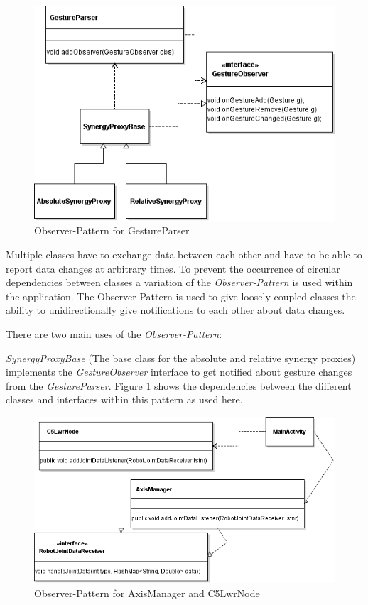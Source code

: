\begin{figure}
	\caption{\label{fig:conc:obs1}Observer-Pattern for GestureParser}
	\includegraphics[width=\linewidth]{assets/chpt_concepts/sw/gesture_observer.png}
\end{figure}

Multiple classes have to exchange data between each other and have to be able to report data changes at arbitrary times. To prevent the occurrence of circular dependencies between classes a variation of the \textit{Observer-Pattern} is used within the application. The Observer-Pattern is used to give loosely coupled classes the ability to unidirectionally give notifications to each other about data changes\cite{Eilebrecht2013}.

There are two main uses of the \textit{Observer-Pattern}: 

\textit{SynergyProxyBase} (The base class for the absolute and relative synergy proxies) implements the \textit{GestureObserver} interface to get notified about gesture changes from the \textit{GestureParser}. Figure \ref{fig:conc:obs1} shows the dependencies between the different classes and interfaces within this pattern as used here.

\begin{figure}
	\caption{Observer-Pattern for AxisManager and C5LwrNode\label{fig:conc:obs2}}
	\includegraphics[width=\linewidth]{assets/chpt_concepts/sw/node_axismanager.png}
\end{figure}

